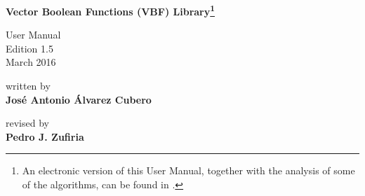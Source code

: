 

\pagestyle{empty}
\sffamily

\vfill
\begin{center}
    \Huge\bfseries
    Vector Boolean Functions (VBF) Library\footnote{An electronic version of
      this User Manual, together with the analysis of some of the algorithms, can be
      found in \cite{relevantWebpage}.}
\end{center}

\vfill\vfill
\begin{center}
    \Large
    User Manual\\
    Edition 1.5\\
    March 2016\\
\end{center}


\vfill
\begin{center}
    \Large
    written by \\
    \huge\bfseries
    Jos\'e Antonio \'Alvarez Cubero
\end{center}


\vfill
\begin{center}
    \Large
    revised by \\
    \bfseries
    Pedro J. Zufiria
\end{center}

\cleardoublepage


\pagestyle{headings}
\tableofcontents


